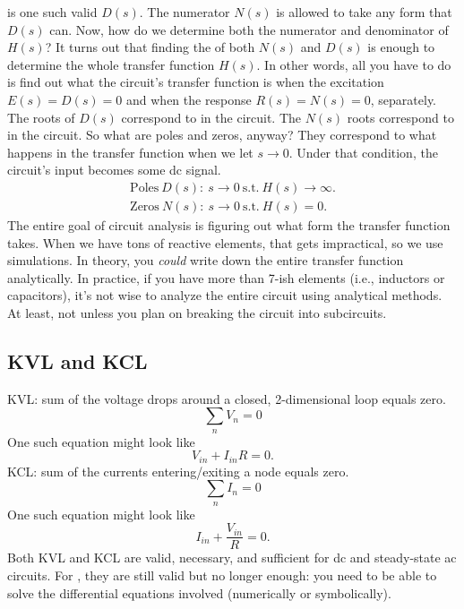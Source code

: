 is one such valid $D(s)$. The numerator $N(s)$ is allowed to take any form that $D(s)$ can. Now, how do we determine both the numerator and denominator of $H(s)$? It turns out that finding the  of both $N(s)$ and $D(s)$ is enough to determine the whole transfer function $H(s)$. In other words, all you have to do is find out what the circuit's transfer function is when the excitation $E(s) = D(s) = 0$ and when the response $R(s) = N(s) = 0$, separately. The roots of $D(s)$ correspond to  in the circuit. The $N(s)$ roots correspond to  in the circuit. So what are poles and zeros, anyway? They correspond to what happens in the transfer function when we let $s \rightarrow 0$. Under that condition, the circuit's input becomes some dc signal.
\begin{align}
\label{eq:1.22}
 \text{Poles}\ D(s) \colon \ s \rightarrow 0 \  \text{s.t.} \  H(s) \rightarrow \infty. \\
\text{Zeros}\ N(s) \colon \ s \rightarrow 0 \  \text{s.t.} \  H(s) = 0.
\end{align}
The entire goal of circuit analysis is figuring out what form the transfer function takes. When we have tons of reactive elements, that gets impractical, so we use simulations. In theory, you \textit{could} write down the entire transfer function analytically. In practice, if you have more than 7-ish  elements (i.e., inductors or capacitors), it's not wise to analyze the entire circuit using analytical methods. At least, not unless you plan on breaking the circuit into subcircuits.

\subsection{KVL and KCL}
KVL: sum of the voltage drops around a closed, 2-dimensional loop equals zero.
\begin{equation}
\label{eq:1.24}
\sum_{n} V_{n} = 0
\end{equation}
One such equation might look like
\begin{equation}
\label{eq:1.25}
V_{in} + I_{in} R = 0.
\end{equation}
KCL: sum of the currents entering/exiting a node equals zero.
\begin{equation}
\label{eq:1.26}
\sum_{n} I_{n} = 0
\end{equation}
One such equation might look like
\begin{equation}
\label{eq:1.27}
I_{in} + \frac{V_{in}}{R} = 0.
\end{equation}
Both KVL and KCL are valid, necessary, and sufficient for dc and steady-state ac circuits. For , they are still valid but no longer enough: you need to be able to solve the differential equations involved (numerically or symbolically).
